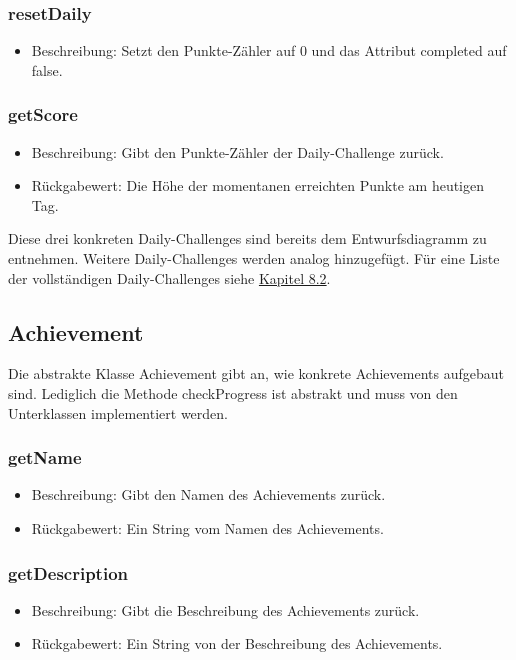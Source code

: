 \documentclass[a4paper]{scrreprt}
\begin{document}
	\subsubsection{resetDaily}
	\begin{itemize}
		\item Beschreibung: Setzt den Punkte-Zähler auf 0 und das Attribut completed auf false.
	\end{itemize}
	\subsubsection{getScore}
	\begin{itemize}
		\item Beschreibung: Gibt den Punkte-Zähler der Daily-Challenge zurück.
		\item Rückgabewert: Die Höhe der momentanen erreichten Punkte am heutigen Tag.
	\end{itemize}

	\vspace{8pt}

	Diese drei konkreten Daily-Challenges sind bereits dem Entwurfsdiagramm zu entnehmen. Weitere Daily-Challenges werden analog hinzugefügt. Für eine Liste der vollständigen Daily-Challenges siehe \hyperlink{Daily}{Kapitel 8.2}. \\

	\vspace{8pt}

	\subsection{Achievement}
	Die abstrakte Klasse Achievement gibt an, wie konkrete Achievements aufgebaut sind. Lediglich die Methode checkProgress ist abstrakt und muss von den Unterklassen implementiert werden.

	\subsubsection{getName}
	\begin{itemize}
		\item Beschreibung: Gibt den Namen des Achievements zurück.
		\item Rückgabewert: Ein String vom Namen des Achievements.
	\end{itemize}
	\subsubsection{getDescription}
	\begin{itemize}
		\item Beschreibung: Gibt die Beschreibung des Achievements zurück.
		\item Rückgabewert: Ein String von der Beschreibung des Achievements.
	\end{itemize}
\end{document}
